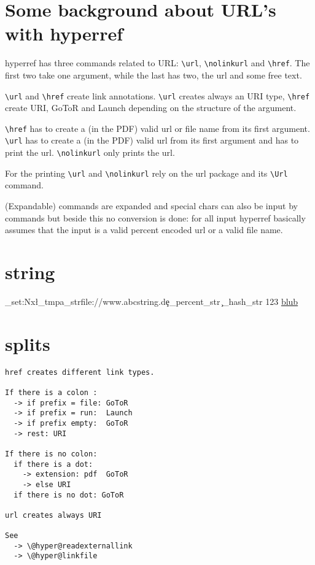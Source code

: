 \documentclass{article}
\newcommand\cs[1]{\texttt{\textbackslash #1}}
\begin{document}
\section{Some background about URL's with hyperref}

hyperref has three commands related to URL: \cs{url},
\cs{nolinkurl} and \cs{href}. The first two take one argument,
while the last has two, the url and some free text.


\cs{url} and \cs{href} create link annotations. \cs{url} creates always an URI 
type, \cs{href} create URI, GoToR and Launch depending on the structure of the argument.

\cs{href} has to create a (in the PDF) valid url or file name from its first argument.
\cs{url} has to create a (in the PDF) valid url from its first argument and has to print 
the url. \cs{nolinkurl} only prints the url.

For the printing \cs{url} and \cs{nolinkurl} rely on the url package and its \cs{Url} command.

(Expandable) commands are expanded and special chars can also be input by commands but beside this
no conversion is done: for all input hyperref basically assumes that the input is a valid percent encoded url or
a valid file name.


\section{string}

\ExplSyntaxOn
\str_set:Nx\l_tmpa_str{file://www.abcstring.de\c_percent_str \c_hash_str 123}
\expandafter\href\expandafter{\l_tmpa_str}{blub}
\ExplSyntaxOff
\section{splits}

\begin{verbatim}
href creates different link types.

If there is a colon :
  -> if prefix = file: GoToR
  -> if prefix = run:  Launch
  -> if prefix empty:  GoToR
  -> rest: URI

If there is no colon:
  if there is a dot:
    -> extension: pdf  GoToR
    -> else URI
  if there is no dot: GoToR

url creates always URI

See
  -> \@hyper@readexternallink
  -> \@hyper@linkfile
\end{verbatim}  
\end{document}
